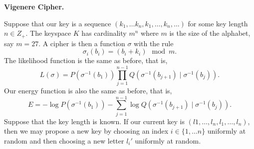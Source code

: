 \documentclass{article}
\begin{document}
\textbf{Vigenere Cipher.} 

Suppose that our key is a sequence $(k_{1}, \ldots k_{n}, k_{1}, \ldots, k_{n}, \ldots)$ for some key length $n \in Z_{+}$. The keyspace $K$ has cardinality $m^{n}$ where $m$ is the size of the alphabet, say $m = 27$. A cipher is then a function $\sigma$ with the rule 
$$\sigma_{i}(b_{i}) = (b_{i} + k_{i}) \mod m.$$
The likelihood function is the same as before, that is, 
$$L(\sigma) = P(\sigma^{-1}(b_{1}))\prod_{j=1}^{n-1}Q(\sigma^{-1}(b_{j+1}) \mid \sigma^{-1}(b_{j})).$$
Our energy function is also the same as before, that is, 
$$E = -\log P(\sigma^{-1}(b_{1})) - \sum_{j=1}^{n-1} \log Q(\sigma^{-1}(b_{j+1}) \mid \sigma^{-1}(b_{j})).$$
Suppose that the key length is known. If our current key is $(l{1}, \ldots, l_{n}, l_{1}, \ldots, l_{n})$, then we may propose a new key by choosing an index $i \in \{1, \ldots n\}$ uniformly at random and then choosing a new letter $l_{i}'$ uniformly at random.
\end{document}
